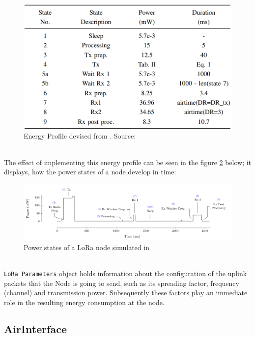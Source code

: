 \begin{figure}[H]
  \centering
  \includegraphics[scale=0.7]{figures/energy_profile.PNG}
  \caption{Energy Profile devised from \cite{energy_profile}. Source: \cite{simulator}}
  \label{fig:energy_profile}
\end{figure}\\

The effect of implementing this energy profile can be seen in the figure \ref{fig:power_states} below; it displays, how the power states of a node develop in time:

\begin{figure}[H]
  \centering
  \hspace*{-1cm}  
  \includegraphics[scale=0.5]{figures/class A 2.PNG}
  \caption{Power states of a LoRa node simulated in \cite{simulator}}
  \label{fig:power_states}
\end{figure}\\

\texttt{LoRa Parameters} object holds information about the configuration of the uplink packets that the Node is going to send, such as its spreading factor, frequency (channel) and transmission power. Subsequently these factors play an immediate role in the resulting energy consumption at the node.

\subsection{AirInterface}

